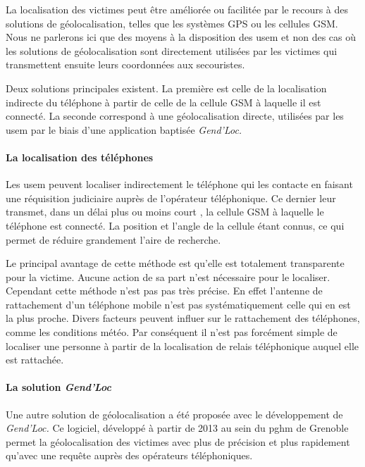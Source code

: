 La localisation des victimes peut être améliorée ou facilitée par le
recours à des solutions de géolocalisation, telles que les systèmes
GPS ou les cellules GSM. Nous ne parlerons ici que des moyens à la
disposition des \ac{usem} et non des cas où les solutions de
géolocalisation sont directement utilisées par les victimes qui
transmettent ensuite leurs coordonnées aux secouristes.

Deux solutions principales existent. La première est celle de la
localisation indirecte du téléphone à partir de celle de la cellule
GSM à laquelle il est connecté. La seconde correspond à une
géolocalisation directe, utilisées par les \ac{usem} par le biais
d'une application baptisée \emph{Gend'Loc.}

\paragraph{La localisation des téléphones}


Les \ac{usem} peuvent localiser indirectement le téléphone qui les
contacte en faisant une réquisition judiciaire auprès de l'opérateur
téléphonique. Ce dernier leur transmet, dans un délai plus ou moins
court , la cellule GSM à laquelle le téléphone est
connecté. La position et l'angle de la cellule étant connus, ce qui
permet de réduire grandement l'aire de recherche.

Le principal avantage de cette méthode est qu'elle est totalement
transparente pour la victime. Aucune action de sa part n'est
nécessaire pour le localiser. Cependant cette méthode n'est pas pas
très précise. En effet l'antenne de rattachement d'un téléphone mobile
n'est pas systématiquement celle qui en est la plus proche. Divers
facteurs peuvent influer sur le rattachement des téléphones, comme les
conditions météo.
% 
Par conséquent il n'est pas forcément simple de localiser une personne
à partir de la localisation de relais téléphonique auquel elle est
rattachée. 

\paragraph{La solution \emph{Gend'Loc}}

Une autre solution de géolocalisation a été proposée avec le
développement de \emph{Gend'Loc.} Ce logiciel, développé à partir de
2013 au sein du \ac{pghm} de Grenoble permet la géolocalisation des
victimes avec plus de précision et plus rapidement qu'avec une requête
auprès des opérateurs téléphoniques.

